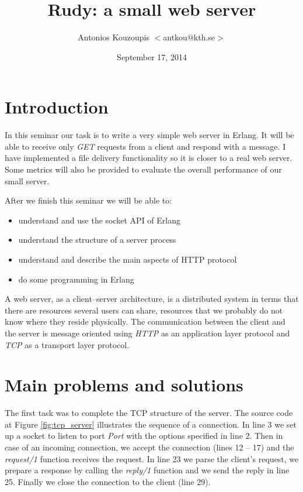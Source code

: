 \documentclass[a4paper]{article}
\title{Rudy: a small web server}
\author{Antonios Kouzoupis $<$antkou$@$kth.se$>$}
\date{September 17, 2014}
\begin{document}
\maketitle

\section{Introduction}

In this seminar our task is to write a very simple web server in Erlang. It will
be able to receive only \textit{GET} requests from a client and respond with a
message. I have implemented a file delivery functionality so it is closer to a
real web server. Some metrics will also be provided to evaluate the overall
performance of our small server.

After we finish this seminar we will be able to:
\begin{itemize}
    \item understand and use the socket API of Erlang
    \item understand the structure of a server process
    \item understand and describe the main aspects of HTTP protocol
    \item do some programming in Erlang
\end{itemize}

A web server, as a client--server architecture, is a distributed system in
terms that there are resources several users can share, resources that we
probably do not know where they reside physically. The communication
between the client and the server is message oriented using \textit{HTTP} as an
application layer protocol and \textit{TCP} as a transport layer protocol.

\section{Main problems and solutions}
The first task was to complete the TCP structure of the server. The source code
at Figure \ref{fig:tcp_server} illustrates the sequence of a connection. In line
3 we set up a socket to listen to port \emph{Port} with the options specified in
line 2. Then in case of an incoming connection, we accept the connection (lines
12 -- 17) and the \textit{request/1} function receives the request. In line 23
we parse the client's request, we prepare a response by calling the
\textit{reply/1} function and we send the reply in line 25. Finally we close the
connection to the client (line 29).\\
\end{document}
